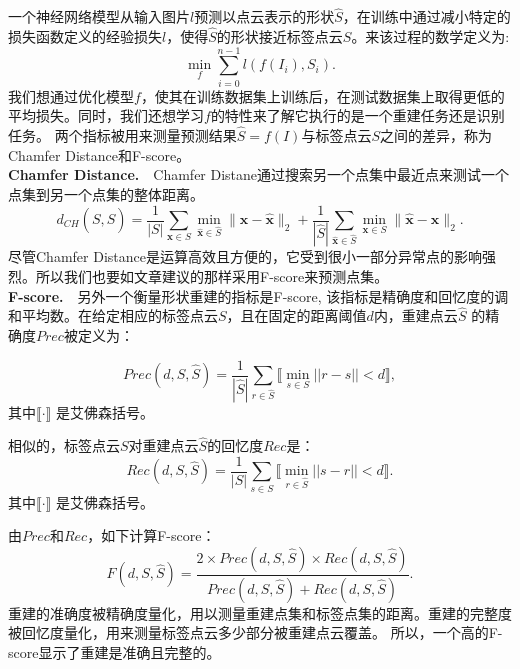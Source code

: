\documentclass[bachelor, nocolorlinks, printoneside]{seuthesis} %
\begin{document}
\begin{Main}
一个神经网络模型从输入图片$l$预测以点云表示的形状$\widehat{S}$，在训练中通过减小特定的损失函数定义的经验损失$l$，使得$\widehat{S}$的形状接近标签点云$S$。来该过程的数学定义为:
\begin{equation}
    \min_f \sum_{i=0}^{n-1} {l(f(I_i), S_i)}.
\end{equation}
我们想通过优化模型$f$，使其在训练数据集上训练后，在测试数据集上取得更低的平均损失。同时，我们还想学习$f$的特性来了解它执行的是一个重建任务还是识别任务。
两个指标被用来测量预测结果$\widehat{S} = f(I)$与标签点云$S$之间的差异，称为Chamfer Distance和F-score。
\\
\noindent
\textbf{Chamfer Distance.}\label{sec:chamfer}~~Chamfer Distane通过搜索另一个点集中最近点来测试一个点集到另一个点集的整体距离。
\begin{equation}\label{eqn:chamfer}
	d_{CH}(S,\widehat{S}) = \frac{1}{|S|}\sum\limits_{\mathbf{x}\in S}\min_{\widehat{\mathbf{x}}\in \widehat{S}}\|\mathbf{x}-\widehat{\mathbf{x}}\|_2 + 
    \frac{1}{|\widehat{S}|}\sum\limits_{\widehat{\mathbf{x}}\in \widehat{S}}\min_{\mathbf{x}\in S}\|\widehat{\mathbf{x}} - \mathbf{x}\|_2.
\end{equation}
尽管Chamfer Distance是运算高效且方便的，它受到很小一部分异常点的影响强烈。所以我们也要如文章\cite{tatarchenko2019single}建议的那样采用F-score来预测点集。
\\
\noindent
\textbf{F-score.}\label{sec:fscore}~~另外一个衡量形状重建的指标是F-score, 该指标是精确度和回忆度的调和平均数。在给定相应的标签点云$S$，且在固定的距离阈值$d$内，重建点云$\widehat{S}$
的精确度$\textit{Prec}$被定义为：

\begin{equation} \label{eq:precision}
\textit{Prec}(\textit{d}, S, \widehat{S}) = \frac{1}{|\widehat{S}|} \sum_{r \in \widehat{S}} \llbracket \min_{s \in S} ||r-s || < \textit{d} \rrbracket,
\end{equation}
其中$\llbracket \cdot \rrbracket$ 是艾佛森括号。
    
相似的，标签点云$S$对重建点云$\widehat{S}$的回忆度$\textit{Rec}$是：
\begin{equation} \label{eq:recall}
    \textit{Rec}(\textit{d}, S, \widehat{S}) = \frac{1}{|S|} \sum_{s \in S} \llbracket \min_{r \in \widehat{S}} ||s-r || < \textit{d} \rrbracket.
    \end{equation}
其中$\llbracket \cdot \rrbracket$ 是艾佛森括号。

由$Prec$和$Rec$，如下计算F-score：
\begin{equation} \label{eq:f-score}
    \textit{F}(\textit{d}, S, \widehat{S}) = \frac{2 \times \textit{Prec}(\textit{d}, S, \widehat{S})\times \textit{Rec}(\textit{d}, S, \widehat{S})}{\textit{Prec}(\textit{d}, S, \widehat{S}) + \textit{Rec}(\textit{d}, S, \widehat{S})}.
\end{equation}
重建的准确度被精确度量化，用以测量重建点集和标签点集的距离。重建的完整度被回忆度量化，用来测量标签点云多少部分被重建点云覆盖。
所以，一个高的F-score显示了重建是准确且完整的\cite{knapitsch2017tanks}。

\end{Main}
\end{document}
